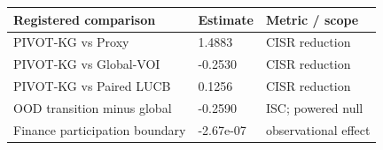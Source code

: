 \begin{tabular}{lll}
\toprule
Registered comparison & Estimate & Metric / scope \\
\midrule
PIVOT-KG vs Proxy & 1.4883 & CISR reduction \\
PIVOT-KG vs Global-VOI & -0.2530 & CISR reduction \\
PIVOT-KG vs Paired LUCB & 0.1256 & CISR reduction \\
OOD transition minus global & -0.2590 & ISC; powered null \\
Finance participation boundary & -2.67e-07 & observational effect \\
\bottomrule
\end{tabular}
